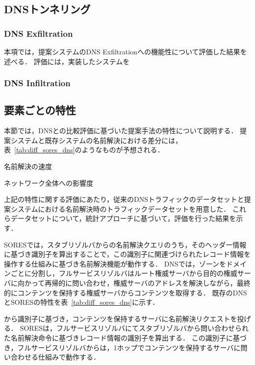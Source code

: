\subsection{DNSトンネリング}
\subsubsection{DNS Exfiltration}
本項では，提案システムのDNS Exfiltrationへの機能性について評価した結果を述べる．
評価には，実装したシステムを
\subsubsection{DNS Infiltration}


\subsection{要素ごとの特性}
本節では，DNSとの比較評価に基づいた提案手法の特性について説明する．
提案システムと既存システムの名前解決における差分には，表~\ref{tab:diff_sores_dns}のようなものが予想される．



\begin{description}
 \setlength{\itemsep}{0pt}
 \setlength{\leftskip}{1.0cm}
 \item[RTT:] 名前解決の速度
 \item[トラフィック量:] ネットワーク全体への影響度
\end{description}

上記の特性に関する評価にあたり，従来のDNSトラフィックのデータセットと提案システムにおける名前解決時のトラフィックデータセットを用意した．
これらデータセットについて，統計アプローチに基づいて，評価を行った結果を示す．


SORESでは，スタブリゾルバからの名前解決クエリのうち，そのヘッダー情報に基づき識別子を算出することで，この識別子に関連づけられたレコード情報を操作する仕組みに基づき名前解決機能が動作する．
DNSでは，ゾーンをドメインごとに分割し，フルサービスリゾルバはルート権威サーバから目的の権威サーバに向かって再帰的に問い合わせ，権威サーバのアドレスを解決しながら，最終的にコンテンツを保持する権威サーバからコンテンツを取得する．
既存のDNSとSORESの特性を表~\ref{tab:diff_sores_dns}に示す．


から識別子に基づき，コンテンツを保持するサーバに名前解決リクエストを投げる．
SORESは，フルサービスリゾルバにてスタブリゾルバから問い合わせられた名前解決命令に基づきレコード情報の識別子を算出する．
この識別子に基づき，フルサービスリゾルバからは，1ホップでコンテンツを保持するサーバに問い合わせる仕組みで動作する．
